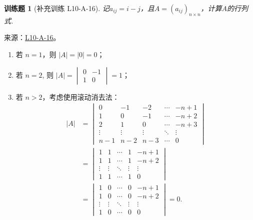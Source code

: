 \documentclass[12pt,fontset=fandol]{ctexart}
\newtheorem{exercise}{训练题}[section]
\begin{document}
\begin{exercise}[补充训练 L10-A-16]\label{prob:L10-A-16}
记$a_{ij}=i-j$，且$A=(a_{ij})_{n\times n}$，计算$A$的行列式.
\end{exercise}
\noindent 来源：\href{https://github.com/yhwu-is/Linear-Algebra-Left-Undone/blob/new/%E8%AE%B2%E4%B9%89/%E4%B8%93%E9%A2%98/10%20%E8%A1%8C%E5%88%97%E5%BC%8F.tex}{L10-A-16}。
\begin{solve}
\begin{enumerate}
                \item 若 $n=1$，则 $|A| = |0| = 0$；

                \item 若 $n=2$, 则 $|A| = \begin{vmatrix} 0 & -1 \\ 1 & 0 \end{vmatrix} = 1$；

                \item 若 $n>2$，考虑使用滚动消去法：
                    \begin{align*}
                        |A| &= \begin{vmatrix}
                            0      & -1     & -2     & \cdots & -n+1   \\
                            1      & 0      & -1     & \cdots & -n+2   \\
                            2      & 1      & 0      & \cdots & -n+3   \\
                            \vdots & \vdots & \vdots & \ddots & \vdots \\
                            n-1    & n-2    & n-3    & \cdots & 0
                        \end{vmatrix} \\
                        &= \begin{vmatrix}
                            1 & 1 & \cdots & 1 & -n+1 \\
                            1 & 1 & \cdots & 1 & -n+2 \\
                            \vdots & \vdots & \ddots & \vdots & \vdots \\
                            1 & 1 & \cdots & 1 & 0
                        \end{vmatrix} \\
                        &= \begin{vmatrix}
                            1 & 0 & \cdots & 0 & -n+1 \\
                            1 & 0 & \cdots & 0 & -n+2 \\
                            \vdots & \vdots & \ddots & \vdots & \vdots \\
                            1 & 0 & \cdots & 0 & 0
                        \end{vmatrix}
                        = 0.
                    \end{align*}
            \end{enumerate}
\end{solve}
\end{document}

